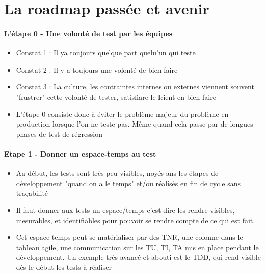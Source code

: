 \section{La roadmap passée et avenir}

\begin{frame}{\insertsectionhead}
  \framesubtitle{L'étape 0 - Une volonté de test par les équipes}
    \begin{itemize}
      \item Constat 1 : Il ya toujours quelque part quelu'un qui teste
      \item Constat 2 : Il y a toujours une volonté de bien faire
      \item Constat 3 : La culture, les contraintes internes ou externes viennent souvent "frustrer" cette volonté de tester, satisfiare le lcient en bien faire
      \item L'étape 0 consiste donc à éviter le problème majeur du problème en production lorsque l'on ne teste pas. Même quand cela passe par de longues phases de test de régression
    \end{itemize}
\end{frame}

\begin{frame}{\insertsectionhead}
  \framesubtitle{Etape 1 - Donner un espace-temps au test}
     \begin{itemize}
      \item Au début, les tests sont très peu visibles, noyés ans les étapes de développement "quand on a le temps" et/ou réalisés en fin de cycle sans traçabilité
      \item Il faut donner aux tests un espace/temps c'est  dire les rendre visibles, mesurables, et identifiables pour pouvoir se rendre compte de ce qui est fait.
      \item Cet espace temps peut se matérialiser par des TNR, une colonne dans le tableau agile, une communication sur les TU, TI, TA mis en place pendant le développement. Un exemple très avancé et abouti est le TDD, qui rend visible dès le début les tests à réaliser
    \end{itemize}
\end{frame}

